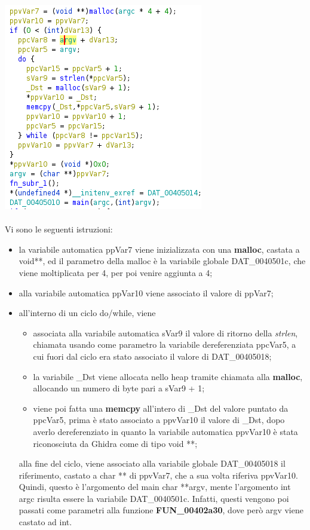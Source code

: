 \documentclass[12pt]{extarticle}
\begin{document}
\includegraphics[scale=0.5]{immagini/pre-main}\\\\
Vi sono le seguenti istruzioni: 
\begin{itemize}
\item la variabile automatica \textsf{ppVar7} viene inizializzata con una \textbf{malloc}, castata a \textsf{void**}, ed il parametro della malloc è la variabile globale \textsf{DAT\_0040501c}, che viene moltiplicata per 4, per poi venire aggiunta a 4;
\item alla variabile automatica \textsf{ppVar10} viene associato il valore di \textsf{ppVar7};
\item all'interno di un ciclo do/while, viene
\begin{itemize}
\item associata alla variabile automatica \textsf{sVar9} il valore di ritorno della \textit{strlen}, chiamata usando come parametro la variabile dereferenziata \textsf{ppcVar5}, a cui fuori dal ciclo era stato associato il valore di \textsf{DAT\_00405018};
\item la variabile \textsf{\_Dst} viene allocata nello heap tramite chiamata alla \textbf{malloc}, allocando un numero di byte pari a \textsf{sVar9} + 1;
\item viene poi fatta una \textbf{memcpy} all'intero di \textsf{\_Dst} del valore puntato da \textsf{ppcVar5}, prima è stato associato a \textsf{ppvVar10} il valore di \textsf{\_Dst}, dopo averlo dereferenziato in quanto la variabile automatica \textsf{ppvVar10} è stata riconosciuta da Ghidra come di tipo \textsf{void **};
\end{itemize}
alla fine del ciclo, viene associato alla variabile globale \textsf{DAT\_00405018} il riferimento, castato a \textsf{char **} di \textsf{ppvVar7}, che a sua volta riferiva \textsf{ppvVar10}. Quindi, questo è l'argomento del main \textsf{char **argv}, mente l'argomento \textsf{int argc} risulta essere la variabile \textsf{DAT\_0040501c}. Infatti, questi vengono poi passati come parametri alla funzione \textbf{FUN\_00402a30}, dove però argv viene castato ad \textsf{int}.
\end{itemize}
\end{document}
